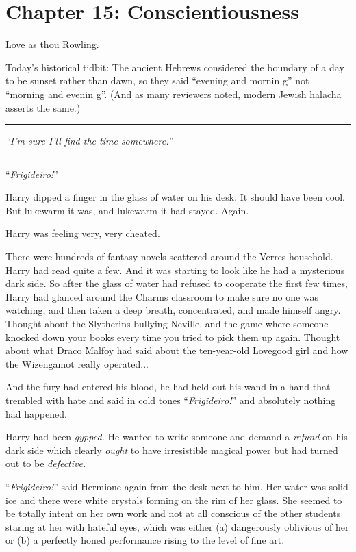 \chapter{Chapter 15: Conscientiousness}
Love as thou Rowling.

Today's historical tidbit: The ancient Hebrews considered the boundary of a day to be sunset rather than dawn, so they said ``evening and mornin g'' not ``morning and evenin g''. (And as many reviewers noted, modern Jewish halacha asserts the same.)

\begin{center}\rule{3in}{0.4pt}\end{center}

\emph{``I'm sure I'll find the time somewhere.''}

\begin{center}\rule{3in}{0.4pt}\end{center}

``\emph{Frigideiro!}''

Harry dipped a finger in the glass of water on his desk. It should have been cool. But lukewarm it was, and lukewarm it had stayed. Again.

Harry was feeling very, very cheated.

There were hundreds of fantasy novels scattered around the Verres household. Harry had read quite a few. And it was starting to look like he had a mysterious dark side. So after the glass of water had refused to cooperate the first few times, Harry had glanced around the Charms classroom to make sure no one was watching, and then taken a deep breath, concentrated, and made himself angry. Thought about the Slytherins bullying Neville, and the game where someone knocked down your books every time you tried to pick them up again. Thought about what Draco Malfoy had said about the ten-year-old Lovegood girl and how the Wizengamot really operated...

And the fury had entered his blood, he had held out his wand in a hand that trembled with hate and said in cold tones ``\emph{Frigideiro!}'' and absolutely nothing had happened.

Harry had been \emph{gypped.} He wanted to write someone and demand a \emph{refund} on his dark side which clearly \emph{ought} to have irresistible magical power but had turned out to be \emph{defective.}

``\emph{Frigideiro!}'' said Hermione again from the desk next to him. Her water was solid ice and there were white crystals forming on the rim of her glass. She seemed to be totally intent on her own work and not at all conscious of the other students staring at her with hateful eyes, which was either (a) dangerously oblivious of her or (b) a perfectly honed performance rising to the level of fine art.

